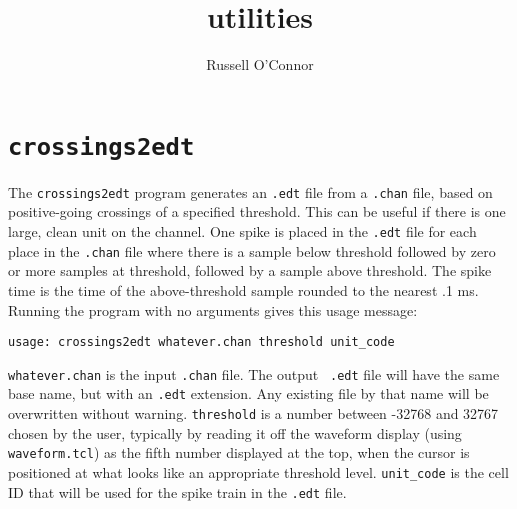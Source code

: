 \documentclass{article}
\begin{document}
\title{utilities}
\author{Russell O'Connor}
\maketitle
\clearpage

\section{\tt crossings2edt}
The {\tt crossings2edt} program generates an {\tt .edt} file from a
{\tt .chan} file, based on positive-going crossings of a specified
threshold.  This can be useful if there is one large, clean unit on
the channel.  One spike is placed in the {\tt .edt} file for each
place in the {\tt .chan} file where there is a sample below threshold
followed by zero or more samples at threshold, followed by a sample
above threshold.  The spike time is the time of the above-threshold
sample rounded to the nearest .1 ms.  Running the program with no
arguments gives this usage message:
\begin{verbatim}
usage: crossings2edt whatever.chan threshold unit_code
\end{verbatim}
{\tt whatever.chan} is the input {\tt .chan} file.  The output {\tt
  .edt} file will have the same base name, but with an {\tt .edt}
extension.  Any existing file by that name will be overwritten without
warning.  {\tt threshold} is a number between -32768 and 32767
chosen by the user, typically by reading it off the waveform display
(using {\tt waveform.tcl}) as the fifth number displayed at the top,
when the cursor is positioned at what looks like an appropriate
threshold level.  {\tt unit\_code} is the cell ID that will be used for
the spike train in the {\tt .edt} file.
\end{document}

